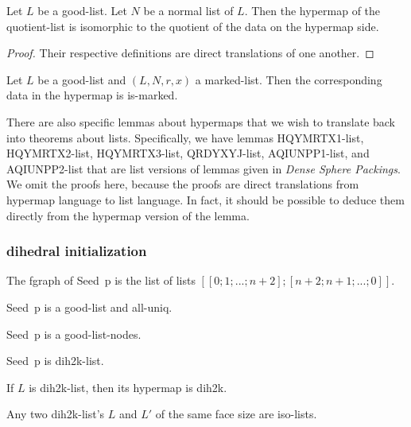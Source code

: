 \begin{lemma} Let $L$ be a good-list.  Let $N$ be a normal list of $L$.
Then the hypermap of the quotient-list is isomorphic to the quotient of the data
on the hypermap side.
\end{lemma}

\begin{proof} Their respective definitions are direct translations of one another.
\end{proof}

\begin{lemma}  Let $L$ be a good-list and $(L,N,r,x)$ a marked-list.
Then the corresponding data in the hypermap is is-marked.
\end{lemma}

There are also specific lemmas about hypermaps that we wish to translate back into theorems
about lists.  Specifically, we have lemmas HQYMRTX1-list, HQYMRTX2-list, HQYMRTX3-list,
QRDYXYJ-list, AQIUNPP1-list, and AQIUNPP2-list that are list versions of lemmas given in {\it Dense Sphere Packings}.
We omit the proofs here, because the proofs are direct translations from hypermap language to list language.
In fact, it should be possible to deduce them directly from the hypermap version of the lemma.


\subsubsection{dihedral  initialization}

The fgraph of Seed~p is the list of lists $[[0;1;...;n+2];[n+2;n+1;...;0]]$.

\begin{lemma} 
 Seed~p is a good-list and all-uniq.
\end{lemma}

\begin{lemma} Seed~p is a good-list-nodes.
\end{lemma}

\begin{lemma}  Seed~p is dih2k-list.
\end{lemma}

\begin{lemma} If $L$ is dih2k-list, then its hypermap is dih2k.
\end{lemma}

\begin{lemma} Any two dih2k-list's $L$ and $L'$ of the same face size are iso-lists.
\end{lemma}

